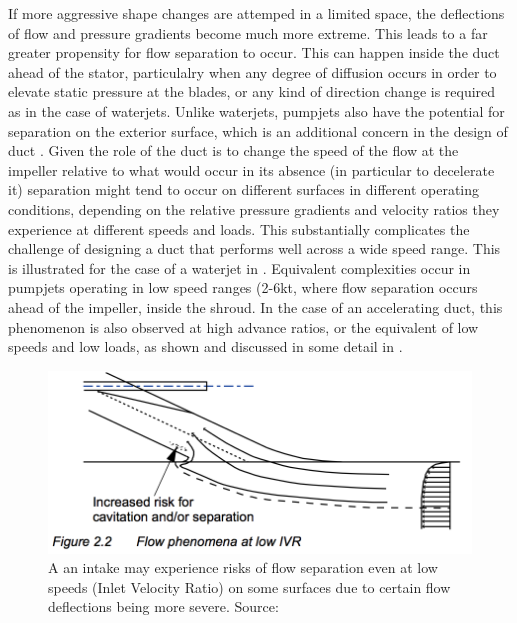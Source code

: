 \documentclass{article}\usepackage[]{graphicx}\usepackage[]{color}
\begin{document}
If more aggressive shape changes are attemped in a limited space, the deflections of flow and pressure gradients become much more extreme. This leads to a far greater propensity for flow separation to occur.  This can happen inside the duct ahead of the stator, particulalry when any degree of diffusion occurs in order to elevate static pressure at the blades, or any kind of direction change is required as in the case of waterjets. Unlike waterjets, pumpjets also have the potential for separation on the exterior surface, which is an additional concern in the design of duct \cite[13]{henderson1964}.  Given the role of the duct is to change the speed of the flow at the impeller relative to what would occur in its absence (in particular to decelerate it) separation might tend to occur on different surfaces in different operating conditions, depending on the relative pressure gradients and velocity ratios they experience at different speeds and loads.  This substantially complicates the challenge of designing a duct that performs well across a wide speed range. This is illustrated for the case of a waterjet in \cite[20]{bulten2006numerical}.  Equivalent complexities occur in pumpjets operating in low speed ranges (2-6kt, where flow separation occurs ahead of the impeller, inside the shroud.  In the case of an accelerating duct, this phenomenon is also observed at high advance ratios, or the equivalent of low speeds and low loads, as shown and discussed in some detail in \cite{willemsen2013}.

\begin{figure}
\includegraphics[width=\textwidth]{LowIVR.png}
\caption{A an intake may experience risks of flow separation even at low speeds (Inlet Velocity Ratio) on some surfaces due to certain flow deflections being more severe. Source: \cite{bulten2006numerical}}
\label{fig:LowIVR.png}
\end{figure}
\end{document}
